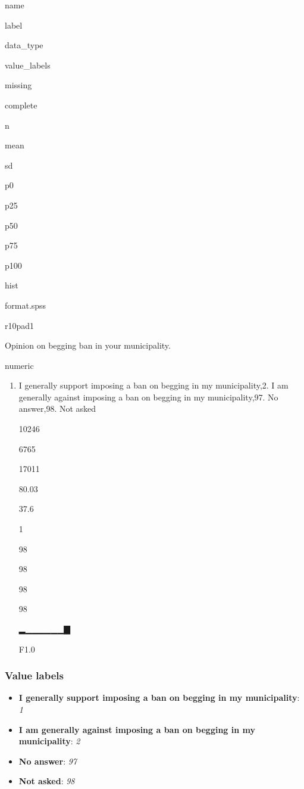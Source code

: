 \documentclass[]{book}
\providecommand{\tightlist}{%
  \setlength{\itemsep}{0pt}\setlength{\parskip}{0pt}}
\begin{document}
name

label

data\_type

value\_labels

missing

complete

n

mean

sd

p0

p25

p50

p75

p100

hist

format.spss

r10pad1

Opinion on begging ban in your municipality.

numeric

\begin{enumerate}
\def\labelenumi{\arabic{enumi}.}
\tightlist
\item
  I generally support imposing a ban on begging in my municipality,2. I
  am generally against imposing a ban on begging in my municipality,97.
  No answer,98. Not asked

  10246

  6765

  17011

  80.03

  37.6

  1

  98

  98

  98

  98

  ▂▁▁▁▁▁▁▇

  F1.0
\end{enumerate}

\subsubsection{Value labels}\label{r10pad1_labels}

\begin{itemize}
\tightlist
\item
  \textbf{I generally support imposing a ban on begging in my
  municipality}: \emph{1}
\item
  \textbf{I am generally against imposing a ban on begging in my
  municipality}: \emph{2}
\item
  \textbf{No answer}: \emph{97}
\item
  \textbf{Not asked}: \emph{98}
\end{itemize}
\end{document}
